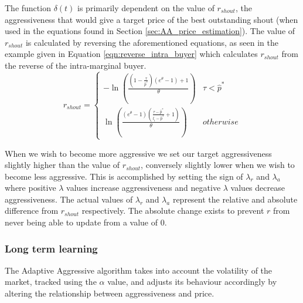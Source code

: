 \documentclass[preprint]{acm_proc_article-sp} %
\begin{document}
The function $\delta(t)$ is primarily dependent on the value of $r_{shout}$,
the aggressiveness that would give a target price of the best outstanding shout
(when used in the equations found in Section \ref{sec:AA_price_estimation}). The
value of $r_{shout}$ is calculated by reversing the aforementioned equations,
as seen in the example given in Equation \ref{eqn:reverse_intra_buyer} which
calculates $r_{shout}$ from the reverse of the intra-marginal buyer.
\begin{equation}
r_{shout}=
\begin{cases}
 -\ln\left(\frac{ \left( 1-\frac{\tau}{\hat p^*} \right) \left( e^\theta-1 \right) + 1}{\theta}\right) & \tau
< \hat p^*\\
\ln\left( \frac{ \left( e^\theta -1 \right) \left( \frac{\tau - \hat p^*}{l_i - \hat p^*} + 1 \right)
}{\theta} \right)&
\textstyle{otherwise}
\end{cases}
\label{eqn:reverse_intra_buyer}
\end{equation}

When we wish to become more aggressive we set our target aggressiveness
slightly higher than the value of $r_{shout}$, conversely slightly lower when
we wish to become less aggressive. This is accomplished by setting the sign of
$\lambda_r$ and $\lambda_a$ where positive $\lambda$ values increase
aggressiveness and negative $\lambda$ values decrease aggressiveness.  The
actual values of $\lambda_r$ and $\lambda_a$ represent the relative and
absolute difference from $r_{shout}$ respectively. The absolute change exists
to prevent $r$ from never being able to update from a value of 0.\\



\subsubsection{Long term learning} \label{sec:AA_long_term_learning}
The Adaptive Aggressive algorithm takes into account the volatility of the market, tracked using the
$\alpha$ value, and adjusts its behaviour accordingly by altering the relationship between aggressiveness and price.
\end{document}
